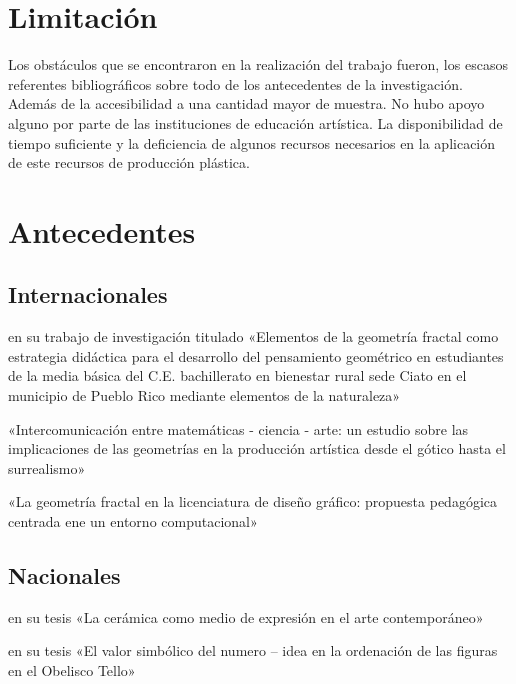 \documentclass[12pt,]{report}
\begin{document}
\hypertarget{limitaciuxf3n}{%
\section{Limitación}\label{limitaciuxf3n}}

Los obstáculos que se encontraron en la realización del trabajo fueron, los escasos
referentes bibliográficos sobre todo de los antecedentes de la investigación. Además de
la accesibilidad a una cantidad mayor de muestra. No hubo apoyo alguno por parte de
las instituciones de educación artística. La disponibilidad de tiempo suficiente y la deficiencia
de algunos recursos necesarios en la aplicación de este recursos de producción
plástica.

\hypertarget{antecedentes}{%
\section{Antecedentes}\label{antecedentes}}

\hypertarget{internacionales}{%
\subsection{Internacionales}\label{internacionales}}

\citep{internacional1} en su trabajo de investigación titulado «Elementos de la geometría
fractal como estrategia didáctica para el desarrollo del pensamiento geométrico en estudiantes
de la media básica del C.E. bachillerato en bienestar rural sede Ciato en el
municipio de Pueblo Rico mediante elementos de la naturaleza»

\citep{internacional2} «Intercomunicación entre matemáticas - ciencia - arte: un estudio sobre
las implicaciones de las geometrías en la producción artística desde el gótico hasta el
surrealismo»

\citep{internacional3} «La geometría fractal en la licenciatura de diseño gráfico: propuesta
pedagógica centrada ene un entorno computacional»

\hypertarget{nacionales}{%
\subsection{Nacionales}\label{nacionales}}

\citep{nacional1} en su tesis «La cerámica como medio de expresión en el
arte contemporáneo»

\citep{nacional2} en su tesis «El valor simbólico del numero -- idea en la ordenación
de las figuras en el Obelisco Tello»
\end{document}
